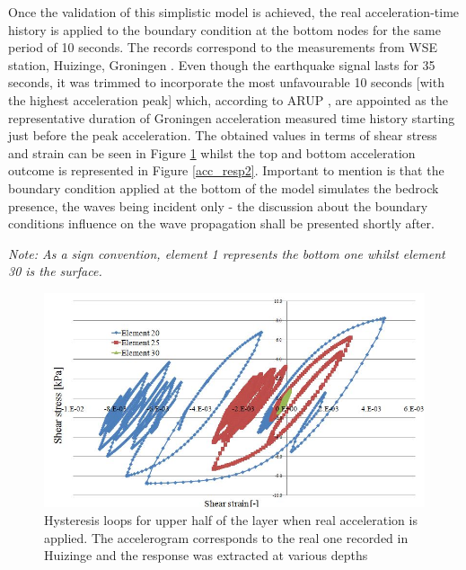 	Once the validation of this simplistic model is achieved, the real acceleration-time history is applied to the boundary condition at the bottom nodes for the same period of 10 seconds. The records correspond to the measurements from WSE station, Huizinge, Groningen \cite{dost2013august}. Even though the earthquake signal lasts for 35 seconds, it was trimmed to incorporate the most unfavourable 10 seconds [with the highest acceleration peak] which, according to ARUP \cite{martellotta2015review}, are appointed as the representative duration of Groningen acceleration measured time history starting just before the peak acceleration. The obtained values in terms of shear stress and strain can be seen in Figure \ref{resp3} whilst the top and bottom acceleration outcome is represented in Figure \ref{acc_resp2}. Important to mention is that the boundary condition applied at the bottom of the model simulates the bedrock presence, the waves being incident only - the discussion about the boundary conditions influence on the wave propagation shall be presented shortly after. 
	
	\textit{Note: As a sign convention, element 1 represents the bottom one whilst element 30 is the surface.}
	\begin{figure} [h!]
		\centering
		\includegraphics[width=0.7\linewidth]{"response3"}
		\caption{Hysteresis loops for upper half of the layer when real acceleration is applied. The accelerogram corresponds to the real one recorded in Huizinge and the response was extracted at various depths}
		\label{resp3}
	\end{figure}
	
